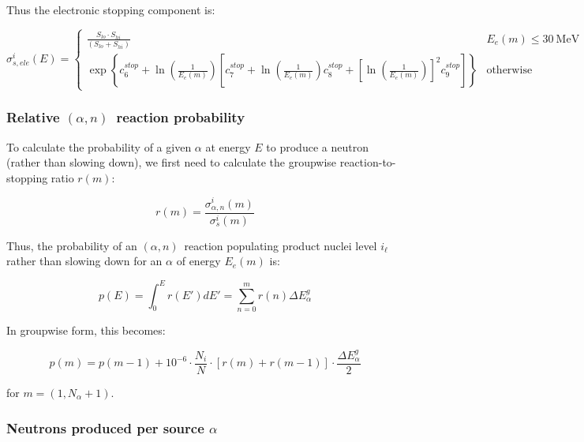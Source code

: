 \documentclass[10pt]{article}
\newcommand{\alphn}[0]{$\left(\alpha,n\right)$}
\begin{document}
Thus the electronic stopping component is:

\begin{equation}
\sigma_{s,ele}^i \left(E\right) =
\begin{cases}
\displaystyle \frac{S_{lo} \cdot S_{hi} }{\left(S_{lo} + S_{hi} \right)} & E_e\left(m\right) \leq 30\ \mathrm{MeV} \\[12pt]
\displaystyle \exp\left\{ {c_6^{stop}} + \ln\left(\frac{1}{E_e\left(m\right)} \right) \left[ c_7^{stop} + \ln\left(\frac{1}{E_e\left(m\right)} \right) c_8^{stop} + \left[\ln\left(\frac{1}{E_e\left(m\right)}\right)\right]^2 c_9^{stop} \right] \right\} & \mathrm{otherwise}
\end{cases}
\end{equation}

\subsubsection{Relative \alphn\ reaction probability}

To calculate the probability of a given $\alpha$ at energy $E$ to produce a neutron (rather than slowing down), we first need to calculate the groupwise reaction-to-stopping ratio $r\left(m\right)$:

\begin{equation}
r\left(m\right) = \frac{ \sigma_{\alpha,n}^i \left(m\right) }{ \sigma_s^i \left(m\right) }
\end{equation}

Thus, the probability of an \alphn\ reaction populating product nuclei level $i_\ell$ rather than slowing down for an $\alpha$ of energy $E_e\left(m\right)$ is:

\begin{equation}
p\left(E\right) = \int_0^E r\left(E'\right) dE' = \sum_{n=0}^{m} r\left(n\right) \Delta E_\alpha^g
\label{eq:an_prob_int}
\end{equation}
 
In groupwise form, this becomes:

\begin{equation}
p\left(m\right) = p\left(m-1\right) + 10^{-6} \cdot \frac{N_i}{N} \cdot \left[ r\left(m \right) + r\left(m - 1 \right)  \right]\cdot \frac{\Delta E_\alpha^g}{2} 
\label{eq:an_prob_groupwise}
\end{equation}

for $m=\left(1,N_\alpha + 1\right)$.

\subsubsection{Neutrons produced per source $\alpha$}
\end{document}

